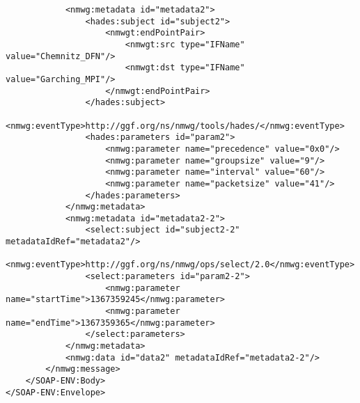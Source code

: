 \documentclass[a4paper,12pt,titlepage,hidelinks,fleqn]{article}
\begin{document}
\begin{flushleft}
\begin{framed}
\begin{lstlisting}
			<nmwg:metadata id="metadata2">
				<hades:subject id="subject2">
					<nmwgt:endPointPair>
						<nmwgt:src type="IFName" value="Chemnitz_DFN"/>
						<nmwgt:dst type="IFName" value="Garching_MPI"/>
					</nmwgt:endPointPair>
				</hades:subject>
				<nmwg:eventType>http://ggf.org/ns/nmwg/tools/hades/</nmwg:eventType>
				<hades:parameters id="param2">
					<nmwg:parameter name="precedence" value="0x0"/>
					<nmwg:parameter name="groupsize" value="9"/>
					<nmwg:parameter name="interval" value="60"/>
					<nmwg:parameter name="packetsize" value="41"/>
				</hades:parameters>
			</nmwg:metadata>
			<nmwg:metadata id="metadata2-2">
				<select:subject id="subject2-2" metadataIdRef="metadata2"/>
				<nmwg:eventType>http://ggf.org/ns/nmwg/ops/select/2.0</nmwg:eventType>
				<select:parameters id="param2-2">
					<nmwg:parameter name="startTime">1367359245</nmwg:parameter>
					<nmwg:parameter name="endTime">1367359365</nmwg:parameter>
				</select:parameters>
			</nmwg:metadata>
			<nmwg:data id="data2" metadataIdRef="metadata2-2"/>
		</nmwg:message>
	</SOAP-ENV:Body>
</SOAP-ENV:Envelope>
\end{lstlisting}
\end{framed}
\end{flushleft}
\end{document}
